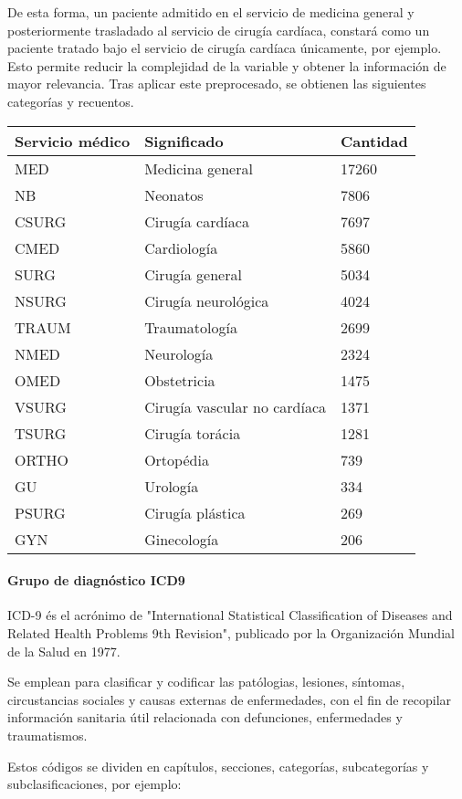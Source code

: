 \documentclass{report}
\begin{document}
De esta forma, un paciente admitido en el servicio de medicina general y
posteriormente trasladado al servicio de cirugía cardíaca, constará como
un paciente tratado bajo el servicio de cirugía cardíaca únicamente, por
ejemplo. Esto permite reducir la complejidad de la variable y obtener la
información de mayor relevancia. Tras aplicar este preprocesado, se
obtienen las siguientes categorías y recuentos.

\begin{longtable}[]{@{}lll@{}}
\toprule
Servicio médico & Significado & Cantidad\tabularnewline
\midrule
\endhead
MED & Medicina general & 17260\tabularnewline
NB & Neonatos & 7806\tabularnewline
CSURG & Cirugía cardíaca & 7697\tabularnewline
CMED & Cardiología & 5860\tabularnewline
SURG & Cirugía general & 5034\tabularnewline
NSURG & Cirugía neurológica & 4024\tabularnewline
TRAUM & Traumatología & 2699\tabularnewline
NMED & Neurología & 2324\tabularnewline
OMED & Obstetricia & 1475\tabularnewline
VSURG & Cirugía vascular no cardíaca & 1371\tabularnewline
TSURG & Cirugía torácia & 1281\tabularnewline
ORTHO & Ortopédia & 739\tabularnewline
GU & Urología & 334\tabularnewline
PSURG & Cirugía plástica & 269\tabularnewline
GYN & Ginecología & 206\tabularnewline
\bottomrule
\end{longtable}

\paragraph{Grupo de diagnóstico ICD9}


ICD-9 és el acrónimo de "International Statistical Classification of
Diseases and Related Health Problems 9th Revision", publicado por la
Organización Mundial de la Salud en 1977.

Se emplean para clasificar y codificar las patólogias, lesiones,
síntomas, circustancias sociales y causas externas de enfermedades, con
el fin de recopilar información sanitaria útil relacionada con
defunciones, enfermedades y traumatismos.

Estos códigos se dividen en capítulos, secciones, categorías,
subcategorías y subclasificaciones, por ejemplo:

\end{document}
